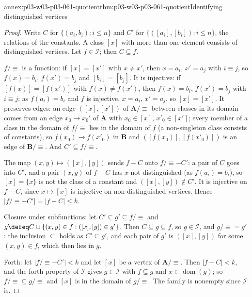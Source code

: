 \begin{annexitem}{annex:p03-w03-p03-061-quotient}{thm:p03-w03-p03-061-quotient}{Identifying distinguished vertices}
\begin{proof}
Write \(C\) for \(\{(a_i,b_i):i\le n\}\) and \(C'\) for
\(\{([a_i],[b_i]):i\le n\}\), the relations of the constants. A class \([x]\)
with more than one element consists of distinguished vertices. Let
\(f\in\mathcal I\); then \(C\subseteq f\).

\(f/{\equiv}\) is a function: if \([x]=[x']\) with \(x\neq x'\), then
\(x=a_i\), \(x'=a_j\) with \(i\equiv j\), so \(f(x)=b_i\), \(f(x')=b_j\) and
\([b_i]=[b_j]\). It is injective: if \([f(x)]=[f(x')]\) with \(f(x)\neq
f(x')\), then \(f(x)=b_i\), \(f(x')=b_j\) with \(i\equiv j\); as
\(f(a_i)=b_i\) and \(f\) is injective, \(x=a_i\), \(x'=a_j\), so
\([x]=[x']\). It preserves edges: an edge \(([x],[x'])\) of \(\mathbf
A/{\equiv}\) between classes in its domain comes from an edge \(x_0\to x_0'\)
of \(\mathbf A\) with \(x_0\in[x]\), \(x'_0\in[x']\); every member of a class
in the domain of \(f/{\equiv}\) lies in the domain of \(f\) (a non-singleton
class consists of constants), so \(f(x_0)\to f(x'_0)\) in \(\mathbf B\) and
\(([f(x_0)],[f(x'_0)])\) is an edge of \(\mathbf B/{\equiv}\). And
\(C'\subseteq f/{\equiv}\).

The map \((x,y)\mapsto([x],[y])\) sends \(f-C\) onto \(f/{\equiv}-C'\): a
pair of \(C\) goes into \(C'\), and a pair \((x,y)\) of \(f-C\) has \(x\) not
distinguished (as \(f(a_i)=b_i\)), so \([x]=\{x\}\) is not the class of a
constant and \(([x],[y])\notin C'\). It is injective on \(f-C\), since
\(x\mapsto[x]\) is injective on non-distinguished vertices. Hence
\(|f/{\equiv}-C'|=|f-C|\le k\).

Closure under subfunctions: let \(C'\subseteq g'\subseteq f/{\equiv}\) and
\(g\defeq C\cup\{(x,y)\in f:([x],[y])\in g'\}\). Then \(C\subseteq g\subseteq
f\), so \(g\in\mathcal I\), and \(g/{\equiv}=g'\): the inclusion
\(\subseteq\) holds as \(C'\subseteq g'\), and each pair of \(g'\) is
\(([x],[y])\) for some \((x,y)\in f\), which then lies in \(g\).

Forth: let \(|f/{\equiv}-C'|<k\) and let \([x]\) be a vertex of
\(\mathbf A/{\equiv}\). Then \(|f-C|<k\), and the forth property of
\(\mathcal I\) gives \(g\in\mathcal I\) with \(f\subseteq g\) and \(x\in
\operatorname{dom}(g)\); so \(f/{\equiv}\subseteq g/{\equiv}\) and \([x]\) is
in the domain of \(g/{\equiv}\). The family is nonempty since \(\mathcal I\)
is.
\end{proof}
\end{annexitem}

